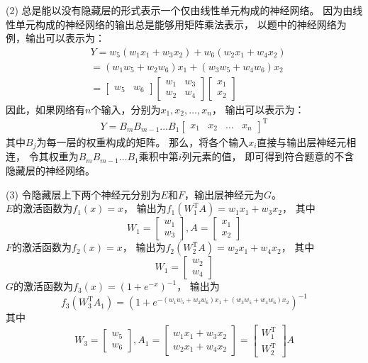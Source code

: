 \documentclass[a4paper,utf8]{article}
\begin{document}
	\noindent (2) 
	总是能以没有隐藏层的形式表示一个仅由线性单元构成的神经网络。
	因为由线性单元构成的神经网络的输出总是能够用矩阵乘法表示，
	以题中的神经网络为例，输出可以表示为：
	\begin{align*}
		& Y=w_5(w_1x_1+w_3x_2)+w_6(w_2x_1+w_4x_2) \\
		& =(w_1w_5+w_2w_6)x_1+(w_3w_5+w_4w_6)x_2 \\
		& =\left[
			\begin{matrix}
				w_5 & w_6
			\end{matrix}
			\right] 
			\left[
			\begin{matrix}
				w_1 & w_3 \\
				w_2 & w_4
			\end{matrix}
			\right]
			\left[
			\begin{matrix}
				x_1 \\
				x_2
			\end{matrix}
			\right]
	\end{align*}
	因此，如果网络有$n$个输入，分别为$x_1,x_2,\dots ,x_n$，
	输出可以表示为：
	\begin{align*}
		Y=B_mB_{m-1}\dots B_1
		\left[
		\begin{matrix}
			x_1 & x_2 & \dots & x_n
		\end{matrix}
		\right]^{\mathrm{T}}
	\end{align*}
	其中$B_j$为每一层的权重构成的矩阵。
	那么，将各个输入$x_i$直接与输出层神经元相连，
	令其权重为$B_mB_{m-1}\dots B_1$乘积中第$i$列元素的值，
	即可得到符合题意的不含隐藏层的神经网络。

	\noindent (3) 
	令隐藏层上下两个神经元分别为$E$和$F$，输出层神经元为$G$。\\
	$E$的激活函数为$f_1(x)=x$，
	输出为$f_1(W_1^{\mathrm{T}}A)=w_1x_1+w_3x_2$，
	其中
	$$
		W_1=\left[
		\begin{matrix}
			w_1 \\
			w_3
		\end{matrix}	
		\right], 
		A=\left[
		\begin{matrix}
			x_1 \\
			x_2
		\end{matrix}	
		\right]
	$$
	$F$的激活函数为$f_2(x)=x$，
	输出为$f_2(W_2^{\mathrm{T}}A)=w_2x_1+w_4x_2$，
	其中
	$$
		W_1=\left[
		\begin{matrix}
			w_2 \\
			w_4
		\end{matrix}	
		\right]
	$$
	$G$的激活函数为$f_3(x)=(1+e^{-x})^{-1}$，
	输出为
	$$
	f_3(W_3^{\mathrm{T}}A_1)=(1+e^{-(w_1w_5+w_2w_6)x_1+(w_3w_5+w_4w_6)x_2})^{-1}
	$$
	其中
	$$
		W_3=\left[
		\begin{matrix}
			w_5 \\
			w_6
		\end{matrix}	
		\right], 
		A_1=\left[
		\begin{matrix}
			w_1x_1+w_3x_2 \\
			w_2x_1+w_4x_2
		\end{matrix}	
		\right]
		=\left[
		\begin{matrix}
			W_1^{\mathrm{T}} \\
			W_2^{\mathrm{T}}
		\end{matrix}	
		\right]A
	$$
\end{document}
